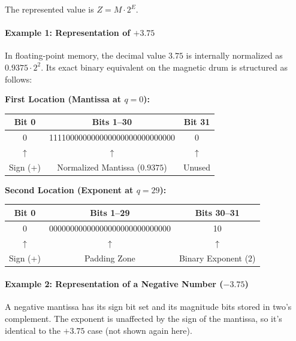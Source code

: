 The represented value is $Z = M \cdot 2^E$.

\paragraph{Example 1: Representation of $+3.75$}
In floating-point memory, the decimal value $3.75$ is internally normalized as $0.9375 \cdot 2^2$. Its exact binary equivalent on the magnetic drum is structured as follows:

\vspace{1em}
\noindent\textbf{First Location (Mantissa at $q = 0$):}
\begin{table}[h]
\centering
\small
\ttfamily
\begin{tabular}{|c|c|c|}
\hline
\textbf{Bit 0} & \textbf{Bits 1--30} & \textbf{Bit 31} \\ \hline
0 & 111100000000000000000000000000 & 0 \\ \hline
\multicolumn{1}{c}{$\uparrow$} & \multicolumn{1}{c}{$\uparrow$} & \multicolumn{1}{c}{$\uparrow$} \\
\multicolumn{1}{c}{\small Sign (+)} & \multicolumn{1}{c}{\small Normalized Mantissa ($0.9375$)} & \multicolumn{1}{c}{\small Unused} \\
\end{tabular}
\end{table}

\noindent\textbf{Second Location (Exponent at $q = 29$):}
\begin{table}[h]
\centering
\small
\ttfamily
\begin{tabular}{|c|c|c|}
\hline
\textbf{Bit 0} & \textbf{Bits 1--29} & \textbf{Bits 30--31} \\ \hline
0 & 00000000000000000000000000000 & 10 \\ \hline
\multicolumn{1}{c}{$\uparrow$} & \multicolumn{1}{c}{$\uparrow$} & \multicolumn{1}{c}{$\uparrow$} \\
\multicolumn{1}{c}{\small Sign (+)} & \multicolumn{1}{c}{\small Padding Zone} & \multicolumn{1}{c}{\small Binary Exponent ($2$)} \\
\end{tabular}
\end{table}

\paragraph{Example 2: Representation of a Negative Number ($-3.75$)}
A negative mantissa has its sign bit set and its magnitude bits stored in two's complement. The exponent is unaffected by the sign of the mantissa, so it's identical to the $+3.75$ case (not shown again here).

